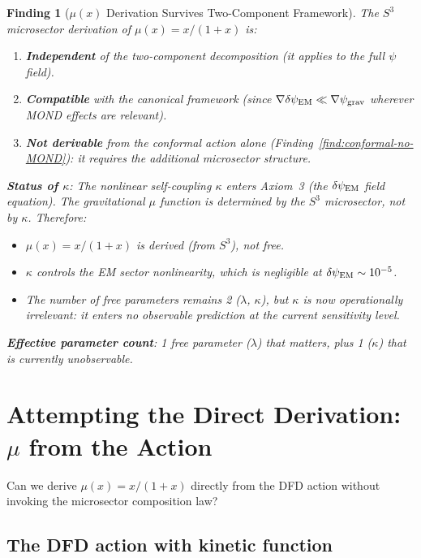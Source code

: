 \documentclass[11pt]{article}
\newtheorem{finding}{Finding}
\newcommand{\psigrav}{\psi_{\rm grav}}
\newcommand{\dpsiEM}{\delta\psi_{\rm EM}}
\newcommand{\mufd}{\mu}
\begin{document}
\begin{finding}[$\mufd(x)$ Derivation Survives Two-Component Framework]
\label{find:mu-survives}
The $S^3$ microsector derivation of $\mufd(x) = x/(1+x)$ is:
\begin{enumerate}[nosep]
\item \textbf{Independent} of the two-component decomposition (it
  applies to the full $\psi$ field).
\item \textbf{Compatible} with the canonical framework (since
  $\nabla\dpsiEM \ll \nabla\psigrav$ wherever MOND effects are
  relevant).
\item \textbf{Not derivable} from the conformal action alone
  (Finding~\ref{find:conformal-no-MOND}): it requires the additional
  microsector structure.
\end{enumerate}

\textbf{Status of $\kappa$}: The nonlinear self-coupling $\kappa$
enters Axiom~3 (the $\dpsiEM$ field equation). The gravitational
$\mufd$ function is determined by the $S^3$ microsector, not by
$\kappa$. Therefore:
\begin{itemize}[nosep]
\item $\mufd(x) = x/(1+x)$ is \emph{derived} (from $S^3$), not free.
\item $\kappa$ controls the \emph{EM sector} nonlinearity, which is
  negligible at $\dpsiEM \sim 10^{-5}$.
\item The number of free parameters remains 2 ($\lambda$, $\kappa$),
  but $\kappa$ is now \emph{operationally irrelevant}: it enters no
  observable prediction at the current sensitivity level.
\end{itemize}

\textbf{Effective parameter count}: 1 free parameter ($\lambda$)
that matters, plus 1 ($\kappa$) that is currently unobservable.
\end{finding}

\section{Attempting the Direct Derivation: $\mufd$ from the Action}
\label{sec:direct-derivation}

Can we derive $\mufd(x) = x/(1+x)$ directly from the DFD action without
invoking the microsector composition law?

\subsection{The DFD action with kinetic function}
\end{document}
